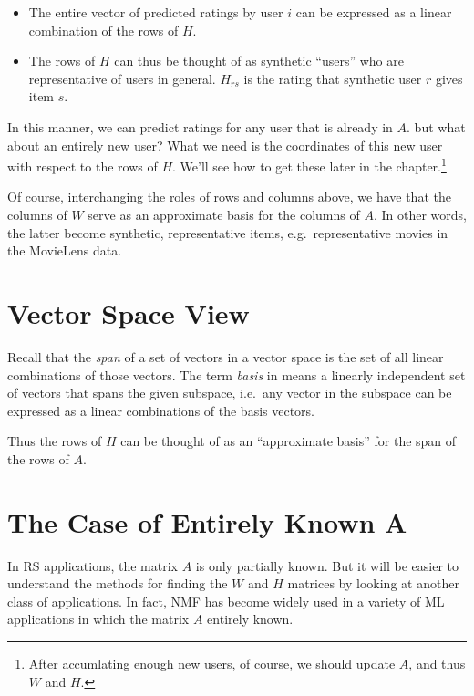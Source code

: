 \begin{itemize}

\item The entire vector of predicted ratings by user $i$ can be
expressed as a linear combination of the rows of $H$.


\item The rows of $H$ can thus be thought of as synthetic
``users'' who are representative of users in general.  $H_{rs}$ is the
rating that synthetic user $r$ gives item $s$.

\end{itemize} 

In this manner, we can predict ratings for any user that is already in
$A$.  but what about an entirely new user?  What we need is the
coordinates of this new user with respect to the rows of $H$.  We'll see
how to get these later in the chapter.\footnote{After accumlating enough
new users, of course, we should update $A$, and thus $W$ and $H$.}

Of course, interchanging the roles of rows and columns above, we have
that the columns of $W$ serve as an approximate basis for the columns of
$A$.  In other words, the latter become synthetic, representative items,
e.g.\ representative movies in the MovieLens data.

\section{Vector Space View}

Recall that the \textit{span} of a set of vectors in a vector space is
the set of all linear combinations of those vectors.  The term
\textit{basis} in means a linearly independent set of vectors that spans
the given subspace, i.e.\ any vector in the subspace can be expressed as
a linear combinations of the basis vectors.

Thus the rows of $H$ can be thought of as an ``approximate
basis'' for the span of the rows of $A$.

\section{The Case of Entirely Known A}

In RS applications, the matrix $A$ is only partially known.  But it will
be easier to understand the methods for finding the $W$ and $H$ matrices
by looking at another class of applications.  In fact, NMF has become
widely used in a variety of ML applications in which the matrix $A$
entirely known. 


